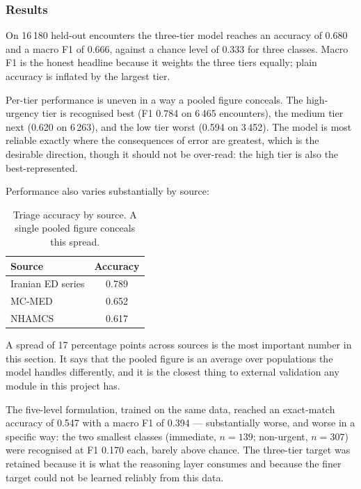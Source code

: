 \subsubsection{Results}
\label{subsec:triage-results}

On 16\,180 held-out encounters the three-tier model reaches an accuracy of 0.680 and a macro
F1 of 0.666, against a chance level of 0.333 for three classes. Macro F1 is the honest headline
because it weights the three tiers equally; plain accuracy is inflated by the largest tier.

Per-tier performance is uneven in a way a pooled figure conceals. The high-urgency tier is
recognised best (F1 0.784 on 6\,465 encounters), the medium tier next (0.620 on 6\,263), and
the low tier worst (0.594 on 3\,452). The model is most reliable exactly where the consequences
of error are greatest, which is the desirable direction, though it should not be over-read: the
high tier is also the best-represented.

Performance also varies substantially by source:

\begin{table}[H]
  \centering
  \small
  \caption{Triage accuracy by source. A single pooled figure conceals this spread.}
  \label{tab:triage-per-source}
  \begin{tabular}{@{}lc@{}}
    \toprule
    Source & Accuracy \\
    \midrule
    Iranian ED series & 0.789 \\
    MC-MED & 0.652 \\
    NHAMCS & 0.617 \\
    \bottomrule
  \end{tabular}
\end{table}

A spread of 17 percentage points across sources is the most important number in this section.
It says that the pooled figure is an average over populations the model handles differently,
and it is the closest thing to external validation any module in this project has.

The five-level formulation, trained on the same data, reached an exact-match accuracy of 0.547
with a macro F1 of 0.394 --- substantially worse, and worse in a specific way: the two smallest
classes (immediate, $n=139$; non-urgent, $n=307$) were recognised at F1 0.170 each, barely
above chance. The three-tier target was retained because it is what the reasoning layer
consumes and because the finer target could not be learned reliably from this data.


